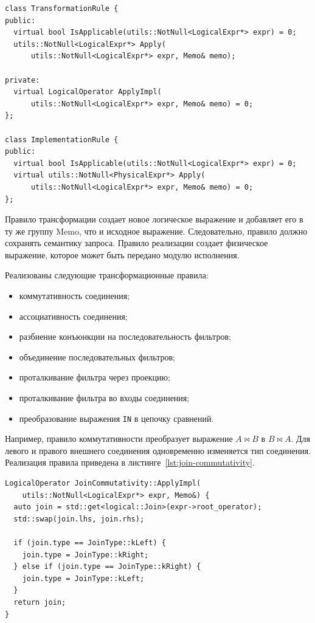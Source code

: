 \documentclass[fontsize=14pt, russian]{scrartcl}
\begin{document}
\begin{listing}[H]
  \caption{Интерфейсы правил оптимизации.}
  \label{lst:optimizer-rules}
  \begin{verbatim}
class TransformationRule {
public:
  virtual bool IsApplicable(utils::NotNull<LogicalExpr*> expr) = 0;
  utils::NotNull<LogicalExpr*> Apply(
      utils::NotNull<LogicalExpr*> expr, Memo& memo);

private:
  virtual LogicalOperator ApplyImpl(
      utils::NotNull<LogicalExpr*> expr, Memo& memo) = 0;
};

class ImplementationRule {
public:
  virtual bool IsApplicable(utils::NotNull<LogicalExpr*> expr) = 0;
  virtual utils::NotNull<PhysicalExpr*> Apply(
      utils::NotNull<LogicalExpr*> expr, Memo& memo) = 0;
};
  \end{verbatim}
\end{listing}

Правило трансформации создает новое логическое выражение и добавляет его в
ту же группу Memo, что и исходное выражение. Следовательно, правило должно
сохранять семантику запроса. Правило реализации создает физическое выражение,
которое может быть передано модулю исполнения.

Реализованы следующие трансформационные правила:
\begin{itemize}
  \item коммутативность соединения;
  \item ассоциативность соединения;
  \item разбиение конъюнкции на последовательность фильтров;
  \item объединение последовательных фильтров;
  \item проталкивание фильтра через проекцию;
  \item проталкивание фильтра во входы соединения;
  \item преобразование выражения \verb|IN| в цепочку сравнений.
\end{itemize}

Например, правило коммутативности преобразует выражение $A \Join B$ в
$B \Join A$. Для левого и правого внешнего соединения одновременно изменяется
тип соединения. Реализация правила приведена в
листинге~\ref{lst:join-commutativity}.

\begin{listing}[H]
  \caption{Правило коммутативности соединения.}
  \label{lst:join-commutativity}
  \begin{verbatim}
LogicalOperator JoinCommutativity::ApplyImpl(
    utils::NotNull<LogicalExpr*> expr, Memo&) {
  auto join = std::get<logical::Join>(expr->root_operator);
  std::swap(join.lhs, join.rhs);

  if (join.type == JoinType::kLeft) {
    join.type = JoinType::kRight;
  } else if (join.type == JoinType::kRight) {
    join.type = JoinType::kLeft;
  }
  return join;
}
  \end{verbatim}
\end{listing}
\end{document}
